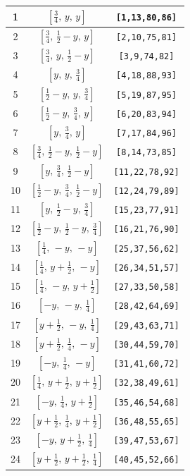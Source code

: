 \documentclass[fleqn,8pt]{jsarticle}
\begin{document}
\begin{longtable}{ccc}
1 & $\left[ \frac{3}{4},\, y,\, y \right]$ & {\tt [1,13,80,86]} \\ \hline
2 & $\left[ \frac{3}{4},\, \frac{1}{2} - y,\, y \right]$ & {\tt [2,10,75,81]} \\ \hline
3 & $\left[ \frac{3}{4},\, y,\, \frac{1}{2} - y \right]$ & {\tt [3,9,74,82]} \\ \hline
4 & $\left[ y,\, y,\, \frac{3}{4} \right]$ & {\tt [4,18,88,93]} \\ \hline
5 & $\left[ \frac{1}{2} - y,\, y,\, \frac{3}{4} \right]$ & {\tt [5,19,87,95]} \\ \hline
6 & $\left[ \frac{1}{2} - y,\, \frac{3}{4},\, y \right]$ & {\tt [6,20,83,94]} \\ \hline
7 & $\left[ y,\, \frac{3}{4},\, y \right]$ & {\tt [7,17,84,96]} \\ \hline
8 & $\left[ \frac{3}{4},\, \frac{1}{2} - y,\, \frac{1}{2} - y \right]$ & {\tt [8,14,73,85]} \\ \hline
9 & $\left[ y,\, \frac{3}{4},\, \frac{1}{2} - y \right]$ & {\tt [11,22,78,92]} \\ \hline
10 & $\left[ \frac{1}{2} - y,\, \frac{3}{4},\, \frac{1}{2} - y \right]$ & {\tt [12,24,79,89]} \\ \hline
11 & $\left[ y,\, \frac{1}{2} - y,\, \frac{3}{4} \right]$ & {\tt [15,23,77,91]} \\ \hline
12 & $\left[ \frac{1}{2} - y,\, \frac{1}{2} - y,\, \frac{3}{4} \right]$ & {\tt [16,21,76,90]} \\ \hline
13 & $\left[ \frac{1}{4},\, - y,\, - y \right]$ & {\tt [25,37,56,62]} \\ \hline
14 & $\left[ \frac{1}{4},\, y + \frac{1}{2},\, - y \right]$ & {\tt [26,34,51,57]} \\ \hline
15 & $\left[ \frac{1}{4},\, - y,\, y + \frac{1}{2} \right]$ & {\tt [27,33,50,58]} \\ \hline
16 & $\left[ - y,\, - y,\, \frac{1}{4} \right]$ & {\tt [28,42,64,69]} \\ \hline
17 & $\left[ y + \frac{1}{2},\, - y,\, \frac{1}{4} \right]$ & {\tt [29,43,63,71]} \\ \hline
18 & $\left[ y + \frac{1}{2},\, \frac{1}{4},\, - y \right]$ & {\tt [30,44,59,70]} \\ \hline
19 & $\left[ - y,\, \frac{1}{4},\, - y \right]$ & {\tt [31,41,60,72]} \\ \hline
20 & $\left[ \frac{1}{4},\, y + \frac{1}{2},\, y + \frac{1}{2} \right]$ & {\tt [32,38,49,61]} \\ \hline
21 & $\left[ - y,\, \frac{1}{4},\, y + \frac{1}{2} \right]$ & {\tt [35,46,54,68]} \\ \hline
22 & $\left[ y + \frac{1}{2},\, \frac{1}{4},\, y + \frac{1}{2} \right]$ & {\tt [36,48,55,65]} \\ \hline
23 & $\left[ - y,\, y + \frac{1}{2},\, \frac{1}{4} \right]$ & {\tt [39,47,53,67]} \\ \hline
24 & $\left[ y + \frac{1}{2},\, y + \frac{1}{2},\, \frac{1}{4} \right]$ & {\tt [40,45,52,66]} \\
\end{longtable}
\end{document}
